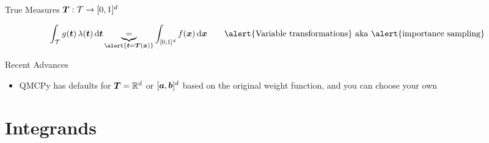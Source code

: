 \documentclass[11pt,compress,xcolor={usenames,dvipsnames},aspectratio=169]{beamer}
\begin{document}
\begin{frame}{True Measures $\boldsymbol{T}: \mathcal{T} \to [0,1]^d$ }

\vspace{-8ex}
	\[
\int_{\ct} g(\vt) \, \lambda(\vt) \, \dif \vt \underbrace{=}_{\alert{\vt = \vT(\vx)}} \int_{[0,1]^d} f(\vx) \, \dif \vx \qquad \text{\alert{Variable transformations} aka \alert{importance sampling}}
\]

	\begin{multicols}{2}
		{\Large \alert{Recent Advances}}
		\begin{itemize}
			\item QMCPy has defaults for $\boldsymbol{T} = \mathbb{R}^d$ or $[\boldsymbol{a},\boldsymbol{b}]^d$ based on  the original weight function, and you can choose your own
						
		\end{itemize}
		
		\columnbreak
		
		
	\end{multicols}
\end{frame}

\section{Integrands}
\end{document}
